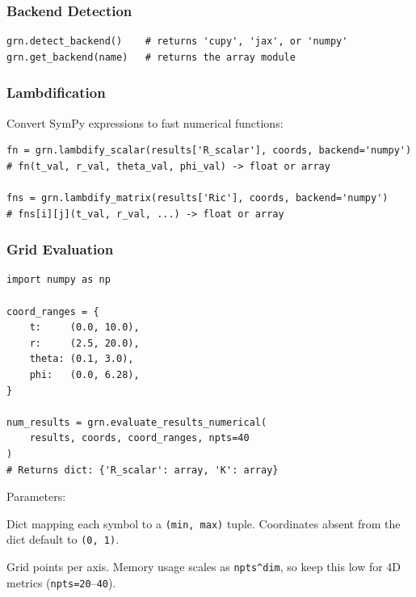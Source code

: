 \documentclass[11pt,a4paper]{article}
\newcommand{\code}[1]{\texttt{\small#1}}
\begin{document}
\subsubsection{Backend Detection}

\begin{lstlisting}
grn.detect_backend()    # returns 'cupy', 'jax', or 'numpy'
grn.get_backend(name)   # returns the array module
\end{lstlisting}

\subsubsection{Lambdification}

Convert SymPy expressions to fast numerical functions:

\begin{lstlisting}
fn = grn.lambdify_scalar(results['R_scalar'], coords, backend='numpy')
# fn(t_val, r_val, theta_val, phi_val) -> float or array

fns = grn.lambdify_matrix(results['Ric'], coords, backend='numpy')
# fns[i][j](t_val, r_val, ...) -> float or array
\end{lstlisting}

\subsubsection{Grid Evaluation}

\begin{lstlisting}
import numpy as np

coord_ranges = {
    t:     (0.0, 10.0),
    r:     (2.5, 20.0),
    theta: (0.1, 3.0),
    phi:   (0.0, 6.28),
}

num_results = grn.evaluate_results_numerical(
    results, coords, coord_ranges, npts=40
)
# Returns dict: {'R_scalar': array, 'K': array}
\end{lstlisting}

Parameters:
\begin{description}[leftmargin=3cm,style=nextline]
  \item[\code{coord\_ranges}]
    Dict mapping each symbol to a \code{(min, max)} tuple.
    Coordinates absent from the dict default to \code{(0, 1)}.
  \item[\code{npts}]
    Grid points per axis.  Memory usage scales as \code{npts\textasciicircum dim},
    so keep this low for 4D metrics (\code{npts=20}--\code{40}).
\end{description}
\end{document}
